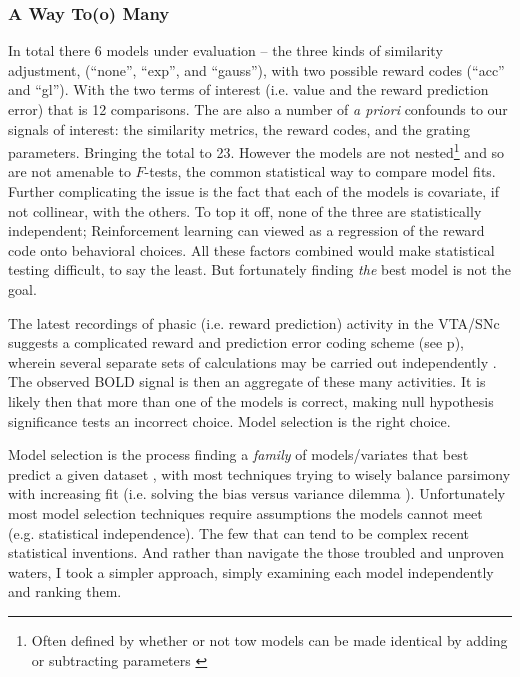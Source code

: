 \documentclass[doc,12pt]{apa}        %
\begin{document}
\subsubsection{A Way To(o) Many}
\label{subsub:tomany}
In total there 6 models under evaluation -- the three kinds of similarity adjustment, (``none'', ``exp'', and ``gauss''), with two possible reward codes (``acc'' and ``gl'').  With the two terms of interest (i.e. value and the reward prediction error) that is 12 comparisons.  The are also a number of \emph{a priori} confounds to our signals of interest: the similarity metrics, the reward codes, and the grating parameters.  Bringing the total to 23.  However the models are not nested\footnote{

    Often defined by whether or not tow models can be made identical by adding or subtracting parameters \cite{Forster:2000p9623}} and so are not amenable to $F$-tests, the common statistical way to compare model fits.  Further complicating the issue is the fact that each of the models is covariate, if not collinear, with the others.  To top it off, none of the three are statistically independent; Reinforcement learning can viewed as a regression of the reward code onto behavioral choices.  All these factors combined would make statistical testing difficult, to say the least.  But fortunately finding \emph{the} best model is not the goal.  

The latest recordings of phasic (i.e. reward prediction) activity in the VTA/SNc suggests a complicated reward and prediction error coding scheme (see p\pageref{subsub:expectations}), wherein several separate sets of calculations may be carried out independently \cite{Kim:2006p1063, Matsumoto:2009p7219, Smith:2011p8133}.  The observed BOLD signal is then an aggregate of these many activities. It is likely then  that more than one of the models is correct, making null hypothesis significance tests an incorrect choice.  Model selection is the right choice.

Model selection is the process finding a \emph{family} of models/variates that best predict a given dataset \cite{Rao:2001p9457}, with most techniques trying to wisely balance parsimony with increasing fit (i.e. solving the bias versus variance dilemma \cite{Geman:1p9469}).  Unfortunately most model selection techniques require assumptions the models cannot meet (e.g. statistical independence).  The few that can tend to be complex recent statistical inventions.  And rather than navigate the those troubled and unproven waters, I took a simpler approach, simply examining each model independently and ranking them.
\end{document}
